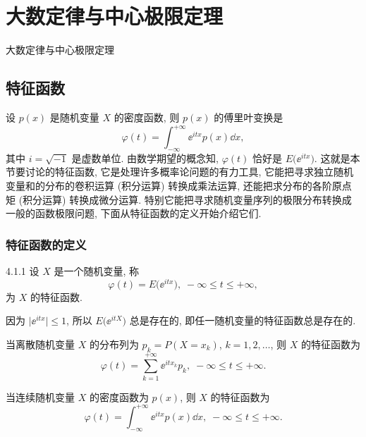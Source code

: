 \setcounter{chapter}{4}

\chapter{大数定律与中心极限定理\label{cha:5}}
大数定律与中心极限定理

\section{特征函数}

设 $ p (x) $ 是随机变量 $ X $ 的密度函数,
则 $ p (x) $ 的傅里叶变换是
\begin{equation*}
    \varphi (t) = \int_{-\infty}^{+\infty} \ee^{itx} p (x) \dd x,
\end{equation*}
其中 $ i = \sqrt{-1} $ 是虚数单位.
由数学期望的概念知,
$ \varphi (t) $ 恰好是 $ E \bigl( \ee^{itx} \bigr) $.
这就是本节要讨论的特征函数,
它是处理许多概率论问题的有力工具,
它能把寻求独立随机变量和的分布的卷积运算 (积分运算) 转换成乘法运算,
还能把求分布的各阶原点矩 (积分运算) 转换成微分运算.
特别它能把寻求随机变量序列的极限分布转换成一般的函数极限问题,
下面从特征函数的定义开始介绍它们.

\subsection{特征函数的定义}

\begin{definition}{}{4.1.1}
    设 $ X $ 是一个随机变量,
    称
    \begin{equation}\label{eq:4.1.1}
        \varphi (t) = E \bigl( \ee^{itx} \bigr), \; -\infty \leq t \leq +\infty,
    \end{equation}
    为 $ X $ 的{\heiti 特征函数}.
\end{definition}

因为 $ \lvert \ee^{itx} \rvert \leq 1 $,
所以 $ E \bigl( \ee^{itX} \bigr) $ 总是存在的,
即任一随机变量的特征函数总是存在的.

当离散随机变量 $ X $ 的分布列为 $ p_k = P ( X = x_k ) $, $ k = 1,2,\dotsc $,
则 $ X $ 的特征函数为
\begin{equation}\label{eq:4.1.2}
    \varphi (t) = \sum_{k=1}^{+\infty} \ee^{itx_k} p_k, \; -\infty \leq t \leq +\infty.
\end{equation}

当连续随机变量 $ X $ 的密度函数为 $ p (x) $,
则 $ X $ 的特征函数为
\begin{equation}\label{eq:4.1.3}
    \varphi (t) = \int_{-\infty}^{+\infty} \ee^{itx} p (x) \dd x, \; -\infty \leq t \leq +\infty.
\end{equation}

